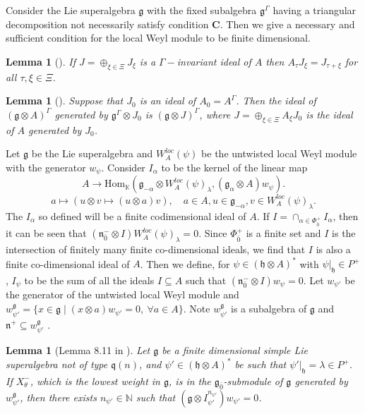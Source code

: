 \documentclass[11pt]{amsart}
\theoremstyle{plain}
\newtheorem{lemma}[thm]{Lemma}
\theoremstyle{definition}
\newcommand{\g}{\mathfrak{g}}
\newcommand{\h}{\mathfrak{h}}
\newcommand{\n}{\mathfrak{n}}
\newcommand{\q}{\mathfrak{q}}
\begin{document}
Consider the Lie superalgebra $\g$ with the fixed subalgebra $\g^{\Gamma}$ having a triangular decomposition not necessarily satisfy condition 
$\mathbf{C}$. Then we give a necessary and sufficient condition for the local Weyl module to be finite dimensional.
\begin{lemma}[\cite{FMS15}]
If $J=\oplus_{\xi\in\Xi}J_{\xi}$ is a $\Gamma-$invariant ideal of $A$ then $A_{\tau}J_{\xi}=J_{\tau+\xi}$ for all $\tau,\xi\in\Xi$.
\end{lemma}
\begin{lemma}[\cite{FMS15}]\label{lem:17}
Suppose that $J_{0}$ is an ideal of $A_{0}=A^{\Gamma}$. Then the ideal of $(\g\otimes A)^{\Gamma}$ generated by $\g^{\Gamma}\otimes J_{0}$ is $(\g\otimes J)^{\Gamma}$, where $J=\oplus_{\xi\in\Xi}A_{\xi}J_{0}$ is the ideal of $A$ generated by $J_{0}$.
\end{lemma}
Let $\g$ be the Lie superalgebra and $W_{A}^{loc}(\psi)$ be the untwisted local Weyl module with the generator $w_{\psi}$. Consider $I_{\alpha}$ to be the kernel of the linear map
\begin{equation*}
    A\longrightarrow \mbox{Hom}_{\mathbb{K}}(\g_{-\alpha}\otimes W_{A}^{loc}(\psi)_{\lambda},(\g_{\alpha}\otimes A)w_{\psi}).
\end{equation*}
\begin{equation*}
    a\longmapsto (u\otimes v\mapsto(u\otimes a)v), \quad a\in A, u\in\g_{-\alpha}, v\in W_{A}^{loc}(\psi)_{\lambda}.
\end{equation*}
The $I_{\alpha}$ so defined will be a finite codimensional ideal of $A$. If $I=\cap_{\alpha\in\Phi_{\bar{0}}^{+}}I_{\alpha}$, then it can be seen that $(\n_{\bar{0}}^{-}\otimes I)W_{A}^{loc}(\psi)_{\lambda}=0$. Since $\Phi_{\bar{0}}^{+}$ is a finite set and $I$ is the intersection of finitely many finite co-dimensional ideals, we find that $I$ is also a finite co-dimensional ideal of $A$. Then we define, for $\psi\in(\h\otimes A)^{*}$ with $\psi|_{\h}\in P^{+}$, $I_{\psi}$ to be the sum of all the ideals $I\subseteq A$ such that $(\n_{\bar{0}}^{-}\otimes I)w_{\psi}=0$.
Let $w_{\psi'}$ be the generator of the untwisted local Weyl module and $w_{\psi'}^{\g}=\{x\in\g \mid (x\otimes a)w_{\psi'}=0,~ \forall a\in A\}$. Note $w_{\psi'}^{\g}$ is a subalgebra of $\g$ and $\n^+ \subseteq w_{\psi'}^{\g}$ \cite{BCM19}.
\begin{lemma}[Lemma 8.11 in \cite{BCM19}] \label{lem:16}
Let $\g$ be a finite dimensional simple Lie superalgebra not of type $\q(n)$, and $\psi'\in(\h\otimes A)^{*}$ be such that $\psi'|_{\h}=\lambda \in P^+$. If $X_{\theta}^{-}$, which is the lowest weight in $\g$, is in the $\g_{\bar{0}}$-submodule of $\g$ generated by $w_{\psi'}^{\g}$, then there exists $n_{\psi'}\in\mathbb{N}$ such that $(\g \otimes I_{\psi'}^{n_{\psi'}})w_{\psi'}=0$.
\end{lemma}
\end{document}
